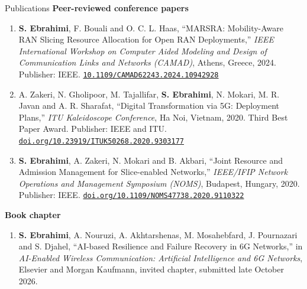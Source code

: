 \documentclass{resume}
\newcommand{\weblink}[2]{\href{#1}{\nolinkurl{#2}}}
\begin{document}
\begin{rSection}{Publications}
\smallskip
\textbf{Peer-reviewed conference papers}
\begin{enumerate}[leftmargin=1.3em, topsep=2pt, itemsep=2pt, parsep=0pt]
  \item \textbf{S. Ebrahimi}, F. Bouali and O. C. L. Haas, ``MARSRA: Mobility-Aware RAN Slicing Resource Allocation for Open RAN Deployments,'' \textit{IEEE International Workshop on Computer Aided Modeling and Design of Communication Links and Networks (CAMAD)}, Athens, Greece, 2024. Publisher: IEEE. \weblink{https://doi.org/10.1109/CAMAD62243.2024.10942928}{10.1109/CAMAD62243.2024.10942928}
  \item A. Zakeri, N. Gholipoor, M. Tajallifar, \textbf{S. Ebrahimi}, N. Mokari, M. R. Javan and A. R. Sharafat, ``Digital Transformation via 5G: Deployment Plans,'' \textit{ITU Kaleidoscope Conference}, Ha Noi, Vietnam, 2020. Third Best Paper Award. Publisher: IEEE and ITU. \weblink{https://doi.org/10.23919/ITUK50268.2020.9303177}{doi.org/10.23919/ITUK50268.2020.9303177}
  \item \textbf{S. Ebrahimi}, A. Zakeri, N. Mokari and B. Akbari, ``Joint Resource and Admission Management for Slice-enabled Networks,'' \textit{IEEE/IFIP Network Operations and Management Symposium (NOMS)}, Budapest, Hungary, 2020. Publisher: IEEE. \weblink{https://doi.org/10.1109/NOMS47738.2020.9110322}{doi.org/10.1109/NOMS47738.2020.9110322}
\end{enumerate}

\smallskip
\textbf{Book chapter}
\begin{enumerate}[leftmargin=1.3em, topsep=2pt, itemsep=2pt, parsep=0pt]
  \item \textbf{S. Ebrahimi}, A. Nouruzi, A. Akhtarshenas, M. Mosahebfard, J. Pournazari and S. Djahel, ``AI-based Resilience and Failure Recovery in 6G Networks,'' in \textit{AI-Enabled Wireless Communication: Artificial Intelligence and 6G Networks}, Elsevier and Morgan Kaufmann, invited chapter, submitted late October 2026.
\end{enumerate}

\end{rSection}
\end{document}

